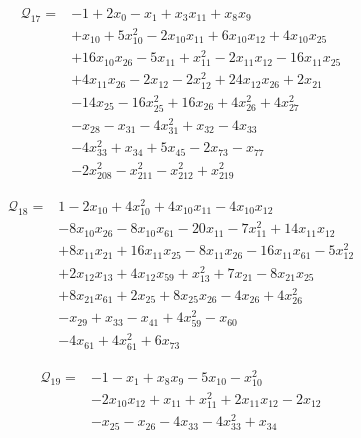 \begin{align*}
\mathcal{Q}_{17}={}&-1+2x_{0}-x_{1}+x_{3}x_{11}+x_{8}x_{9}\\
&+x_{10}+5x_{10}^{2}-2x_{10}x_{11}+6x_{10}x_{12}+4x_{10}x_{25}\\
&+16x_{10}x_{26}-5x_{11}+x_{11}^{2}-2x_{11}x_{12}-16x_{11}x_{25}\\
&+4x_{11}x_{26}-2x_{12}-2x_{12}^{2}+24x_{12}x_{26}+2x_{21}\\
&-14x_{25}-16x_{25}^{2}+16x_{26}+4x_{26}^{2}+4x_{27}^{2}\\
&-x_{28}-x_{31}-4x_{31}^{2}+x_{32}-4x_{33}\\
&-4x_{33}^{2}+x_{34}+5x_{45}-2x_{73}-x_{77}\\
&-2x_{208}^{2}-x_{211}^{2}-x_{212}^{2}+x_{219}^{2}
\end{align*}

\begin{align*}
\mathcal{Q}_{18}={}&1-2x_{10}+4x_{10}^{2}+4x_{10}x_{11}-4x_{10}x_{12}\\
&-8x_{10}x_{26}-8x_{10}x_{61}-20x_{11}-7x_{11}^{2}+14x_{11}x_{12}\\
&+8x_{11}x_{21}+16x_{11}x_{25}-8x_{11}x_{26}-16x_{11}x_{61}-5x_{12}^{2}\\
&+2x_{12}x_{13}+4x_{12}x_{59}+x_{13}^{2}+7x_{21}-8x_{21}x_{25}\\
&+8x_{21}x_{61}+2x_{25}+8x_{25}x_{26}-4x_{26}+4x_{26}^{2}\\
&-x_{29}+x_{33}-x_{41}+4x_{59}^{2}-x_{60}\\
&-4x_{61}+4x_{61}^{2}+6x_{73}
\end{align*}

\begin{align*}
\mathcal{Q}_{19}={}&-1-x_{1}+x_{8}x_{9}-5x_{10}-x_{10}^{2}\\
&-2x_{10}x_{12}+x_{11}+x_{11}^{2}+2x_{11}x_{12}-2x_{12}\\
&-x_{25}-x_{26}-4x_{33}-4x_{33}^{2}+x_{34}
\end{align*}

